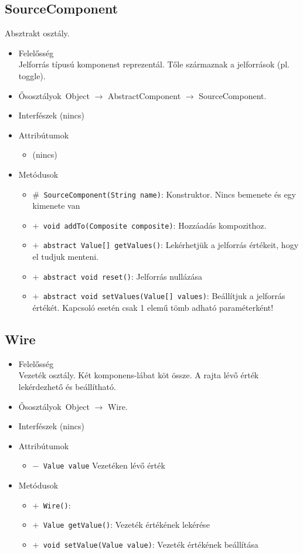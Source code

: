 \subsection{SourceComponent}
Absztrakt osztály.
\begin{itemize}
\item Felelősség\\
Jelforrás típusú komponenst reprezentál. Tőle származnak a jelforrások (pl. toggle).
\item Ősosztályok\ Object $\rightarrow{}$ AbstractComponent $\rightarrow{}$ SourceComponent.
\item Interfészek (nincs)
\item Attribútumok $\ $
\begin{itemize}
\item (nincs)
\end{itemize}
\item Metódusok$\ $
\begin{itemize}
	\item[] \texttt{$\#$ SourceComponent(String name)}: Konstruktor. Nincs bemenete és egy kimenete van
	\item[] \texttt{$+$ void addTo(Composite composite)}: Hozzáadás kompozithoz.
	\item[] \texttt{$+$ abstract Value[] getValues()}: Lekérhetjük a jelforrás értékeit, hogy el tudjuk menteni.
	\item[] \texttt{$+$ abstract void reset()}: Jelforrás nullázása
	\item[] \texttt{$+$ abstract void setValues(Value[] values)}: Beállítjuk a jelforrás értékét. Kapcsoló esetén csak 1 elemű tömb  adható paraméterként!
\end{itemize}
\end{itemize}

\subsection{Wire}
\begin{itemize}
\item Felelősség\\
Vezeték osztály. Két komponens-lábat köt össze. A rajta lévő érték lekérdezhető  és beállítható.
\item Ősosztályok\ Object $\rightarrow{}$ Wire.
\item Interfészek (nincs)
\item Attribútumok $\ $
\begin{itemize}
	\item[] \texttt{$-$ Value value} Vezetéken lévő érték
\end{itemize}
\item Metódusok$\ $
\begin{itemize}
	\item[] \texttt{$+$ Wire()}: 
	\item[] \texttt{$+$ Value getValue()}: Vezeték értékének lekérése
	\item[] \texttt{$+$ void setValue(Value value)}: Vezeték értékének beállítása
\end{itemize}
\end{itemize}

